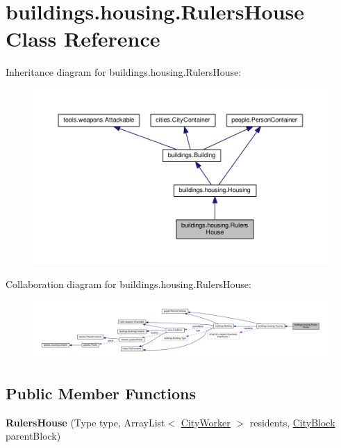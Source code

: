 \hypertarget{classbuildings_1_1housing_1_1_rulers_house}{}\section{buildings.\+housing.\+Rulers\+House Class Reference}
\label{classbuildings_1_1housing_1_1_rulers_house}


Inheritance diagram for buildings.\+housing.\+Rulers\+House\+:\nopagebreak
\begin{figure}[H]
\begin{center}
\leavevmode
\includegraphics[width=350pt]{classbuildings_1_1housing_1_1_rulers_house__inherit__graph}
\end{center}
\end{figure}


Collaboration diagram for buildings.\+housing.\+Rulers\+House\+:\nopagebreak
\begin{figure}[H]
\begin{center}
\leavevmode
\includegraphics[width=350pt]{classbuildings_1_1housing_1_1_rulers_house__coll__graph}
\end{center}
\end{figure}
\subsection*{Public Member Functions}
\begin{DoxyCompactItemize}
\item 
{\bfseries Rulers\+House} (Type type, Array\+List$<$ \hyperlink{classpeople_1_1cityworkers_1_1_city_worker}{City\+Worker} $>$ residents, \hyperlink{classcities_1_1_city_block}{City\+Block} parent\+Block)\hypertarget{classbuildings_1_1housing_1_1_rulers_house_a8a1d4e8d31a26db7dfa1f74aaa4a6bb6}{}\label{classbuildings_1_1housing_1_1_rulers_house_a8a1d4e8d31a26db7dfa1f74aaa4a6bb6}

\end{DoxyCompactItemize}
